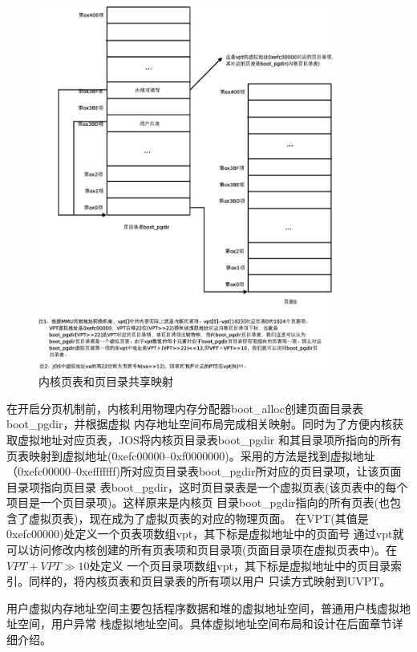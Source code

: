 \documentclass[12pt,openany,a4paper]{report}
\begin{document}
	\begin{figure}[htb]
		\centering
		\includegraphics[height=12cm]{vpt.eps}
		\caption[内核页表和页目录共享映射]{内核页表和页目录共享映射}
	\end{figure}

	    在开启分页机制前，内核利用物理内存分配器boot\_alloc创建页面目录表boot\_pgdir，并根据虚拟
	内存地址空间布局完成相关映射。同时为了方便内核获取虚拟地址对应页表，JOS将内核页目录表boot\_pgdir
	和其目录项所指向的所有页表映射到虚拟地址(0xefc00000--0xf0000000)。采用的方法是找到虚拟地址
	（0xefc00000--0xefffffff)所对应页目录表boot\_pgdir所对应的页目录项，让该页面目录项指向页目录
	表boot\_pgdir，这时页目录表是一个虚拟页表(该页表中的每个项目是一个页目录项)。这样原来是内核页
	目录boot\_pgdir指向的所有页表(也包含了虚拟页表)，现在成为了虚拟页表的对应的物理页面。
	在VPT(其值是0xefc00000)处定义一个页表项数组vpt，其下标是虚拟地址中的页面号
	通过vpt就可以访问修改内核创建的所有页表项和页目录项(页面目录项在虚拟页表中)。在$VPT+VPT\gg10$处定义
	一个页目录项数组vpt，其下标是虚拟地址中的页目录索引。同样的，将内核页表和页目录表的所有项以用户
	只读方式映射到UVPT。\par
	
	    用户虚拟内存地址空间主要包括程序数据和堆的虚拟地址空间，普通用户栈虚拟地址空间，用户异常
	栈虚拟地址空间。具体虚拟地址空间布局和设计在后面章节详细介绍。\par
\end{document}
